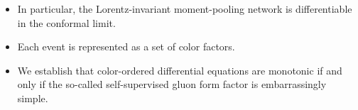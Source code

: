 \begin{itemize}
  \item In particular, the Lorentz-invariant moment-pooling network is differentiable in the conformal limit.
  \item Each event is represented as a set of color factors.
  \item We establish that color-ordered differential equations are monotonic if and only if the so-called self-supervised gluon form factor is embarrassingly simple.
\end{itemize}

